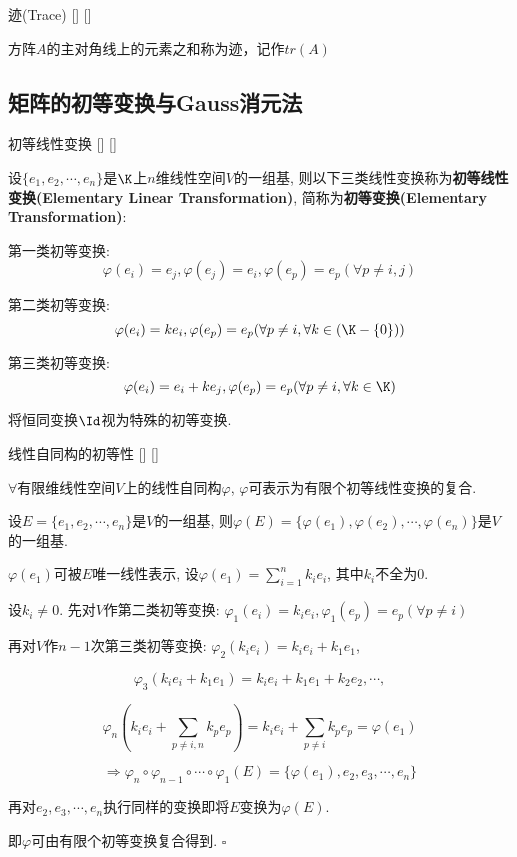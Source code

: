 \documentclass[UTF8]{ctexart}
\begin{document}
		\begin{dfn}
			[]
			{迹(Trace)}
			[]
			[]

            方阵$A$的主对角线上的元素之和称为迹，记作$tr(A)$
		\end{dfn}
		
	\subsection{矩阵的初等变换与Gauss消元法}
	
		\begin{dfn}
			[]
			{初等线性变换}
			[]
			[]

			设$\{e_1,e_2,\cdots,e_n\}$是$\K$上$n$维线性空间$V$的一组基, 则以下三类线性变换称为\textbf{初等线性变换(Elementary Linear Transformation)}, 简称为\textbf{初等变换(Elementary Transformation)}: 
			
			第一类初等变换: $$\varphi(e_i)=e_j, \varphi(e_j)=e_i, \varphi(e_p)=e_p(\forall p\neq i,j)$$
			
			第二类初等变换: $$\varphi(e_i)=ke_i, \varphi(e_p)=e_p(\forall p\neq i, \forall k\in(\K-\{0\}))$$
			
			第三类初等变换: $$\varphi(e_i)=e_i+ke_j, \varphi(e_p)=e_p(\forall p\neq i, \forall k\in\K)$$
			
			将恒同变换$\Id$视为特殊的初等变换. 
		\end{dfn}
		
		\begin{ppt}
			[]
			{线性自同构的初等性}
			[]
			[]

			$\forall$有限维线性空间$V$上的线性自同构$\varphi$, $\varphi$可表示为有限个初等线性变换的复合. 
		\end{ppt}
  
		\begin{prf}
			设$E=\{e_1,e_2,\cdots,e_n\}$是$V$的一组基, 则$\varphi(E)=\{\varphi(e_1),\varphi(e_2),\cdots,\varphi(e_n)\}$是$V$的一组基. 
			
			$\varphi(e_1)$可被$E$唯一线性表示, 设$\varphi(e_1)=\sum_{i=1}^{n}k_{i}e_i$, 其中$k_i$不全为$0$. 
			
			设$k_i\neq 0$. 先对$V$作第二类初等变换: $\varphi_1(e_i)=k_ie_i, \varphi_1(e_p)=e_p(\forall p\neq i)$
			
			再对$V$作$n-1$次第三类初等变换: $\varphi_2(k_ie_i)=k_ie_i+k_1e_1$,
			
			$$\varphi_3(k_ie_i+k_1e_1)=k_ie_i+k_1e_1+k_2e_2, \cdots, $$
			
			$$\varphi_n(k_ie_i+\sum_{p\neq i,n}k_pe_p)=k_ie_i+\sum_{p\neq i}k_pe_p=\varphi(e_1)$$
			
			$$\Longrightarrow \varphi_n\circ\varphi_{n-1}\circ\cdots\circ\varphi_1(E)=\{\varphi(e_1),e_2,e_3,\cdots,e_n\}$$
			
			再对$e_2,e_3,\cdots,e_n$执行同样的变换即将$E$变换为$\varphi(E)$. 
			
			即$\varphi$可由有限个初等变换复合得到. $\square$
		\end{prf}
		
\end{document}
